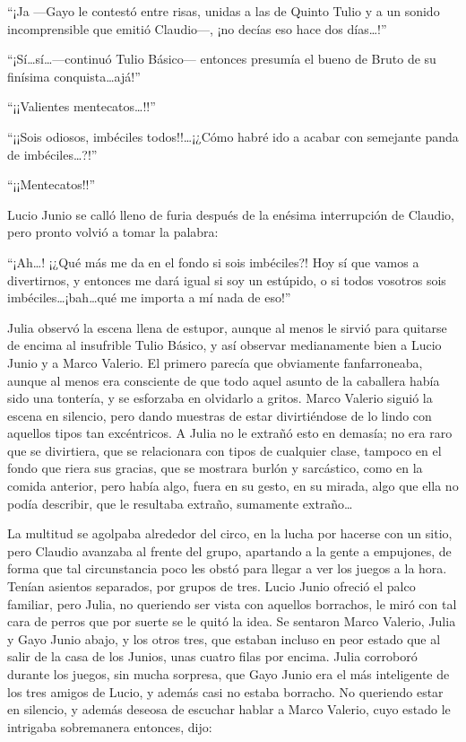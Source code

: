 \documentclass[11pt,openany]{book}
\begin{document}
“¡Ja —Gayo le contestó entre risas, unidas a las de Quinto Tulio y a un sonido incomprensible que emitió Claudio—, ¡no decías eso hace dos días\dots!” 

“¡Sí\dots sí\dots —continuó Tulio Básico— entonces presumía el bueno de Bruto de su finísima conquista\dots ajá!” 

“¡¡Valientes mentecatos\dots!!” 

“¡¡Sois odiosos, imbéciles todos!!\dots ¡¿Cómo habré ido a acabar con semejante panda de imbéciles\dots?!” 

“¡¡Mentecatos!!” 

Lucio Junio se calló lleno de furia después de la enésima interrupción de Claudio, pero pronto volvió a tomar la palabra: 

“¡Ah\dots! ¡¿Qué más me da en el fondo si sois imbéciles?! Hoy sí que vamos a divertirnos, y entonces me dará igual si soy un estúpido, o si todos vosotros sois imbéciles\dots ¡bah\dots qué me importa a mí nada de eso!” 

Julia observó la escena llena de estupor, aunque al menos le sirvió para quitarse de encima al insufrible Tulio Básico, y así observar medianamente bien a Lucio Junio y a Marco Valerio. El primero parecía que obviamente fanfarroneaba, aunque al menos era consciente de que todo aquel asunto de la caballera había sido una tontería, y se esforzaba en olvidarlo a gritos. Marco Valerio siguió la escena en silencio, pero dando muestras de estar divirtiéndose de lo lindo con aquellos tipos tan excéntricos. A Julia no le extrañó esto en demasía; no era raro que se divirtiera, que se relacionara con tipos de cualquier clase, tampoco en el fondo que riera sus gracias, que se mostrara burlón y sarcástico, como en la comida anterior, pero había algo, fuera en su gesto, en su mirada, algo que ella no podía describir, que le resultaba extraño, sumamente extraño\dots 

La multitud se agolpaba alrededor del circo, en la lucha por hacerse con un sitio, pero Claudio avanzaba al frente del grupo, apartando a la gente a empujones, de forma que tal circunstancia poco les obstó para llegar a ver los juegos a la hora. Tenían asientos separados, por grupos de tres. Lucio Junio ofreció el palco familiar, pero Julia, no queriendo ser vista con aquellos borrachos, le miró con tal cara de perros que por suerte se le quitó la idea. Se sentaron Marco Valerio, Julia y Gayo Junio abajo, y los otros tres, que estaban incluso en peor estado que al salir de la casa de los Junios, unas cuatro filas por encima. Julia corroboró durante los juegos, sin mucha sorpresa, que Gayo Junio era el más inteligente de los tres amigos de Lucio, y además casi no estaba borracho. No queriendo estar en silencio, y además deseosa de escuchar hablar a Marco Valerio, cuyo estado le intrigaba sobremanera entonces, dijo: 
\end{document}

